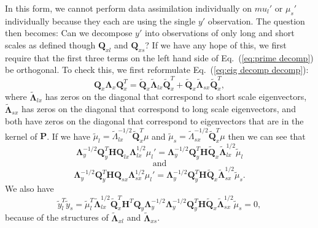 \documentclass[11pt]{article} %
\newcommand{\mat}{\mathbf}
\begin{document}
In this form, we cannot perform data assimilation individually on
$mu_l'$ or $\mu_s'$ individually because they each are using the
single $y'$ observation.
The question then becomes: Can we decompose $y'$ into observations of
only long and short scales as defined though $\mat{Q}_{xl}$ and
$\mat{Q}_{xs}$?
If we have any hope of this, we first require that the first three
terms on the left hand side of Eq.~(\ref{eq:prime decomp}) be
orthogonal.
To check this, we first reformulate Eq.~(\ref{eq:eig decomp decomp}):
\begin{equation}\label{eq:eig decomp decomp full}
  \mat{Q}_x \mat{\Lambda}_x \mat{Q}_x^T
  = \tilde{\mat{Q}}_{x} \tilde{\mat{\Lambda}}_{lx} \tilde{\mat{Q}}_{x}^T
  + \tilde{\mat{Q}}_{x} \tilde{\mat{\Lambda}}_{sx} \tilde{\mat{Q}}_{x}^T,
\end{equation}
where $\tilde{\mat{\Lambda}}_{lx}$ has zeros on the diagonal that
correspond to short scale eigenvectors,
$\tilde{\mat{\Lambda}}_{sx}$ has zeros on the diagonal that correspond
to long scale eigenvectors, and both have zeros on the diagonal that
correspond to eigenvectors that are in the kernel of $\mat{P}$.
If we have $\tilde{\mu}_l = \tilde{\Lambda}_{lx}^{-1/2}
\tilde{\mat{Q}}_x^T \mu$ and $\tilde{\mu}_s =
\tilde{\Lambda}_{sx}^{-1/2} \tilde{\mat{Q}}_x^T \mu$ then we can see
that
\[
  \mat{\Lambda}_y^{-1/2} \mat{Q}_y^T
  \mat{H} \mat{Q}_{lx} \mat{\Lambda}_{lx}^{1/2} \mu_l'
  =\mat{\Lambda}_y^{-1/2} \mat{Q}_y^T
  \mat{H} \tilde{\mat{Q}}_{x} \tilde{\mat{\Lambda}}_{lx}^{1/2}
  \tilde{\mu}_l
\]
\[\text{and}\]
\[
  \mat{\Lambda}_y^{-1/2} \mat{Q}_y^T
  \mat{H} \mat{Q}_{sx} \mat{\Lambda}_{sx}^{1/2} \mu_l'
  =\mat{\Lambda}_y^{-1/2} \mat{Q}_y^T
  \mat{H} \tilde{\mat{Q}}_{x} \tilde{\mat{\Lambda}}_{sx}^{1/2}
  \tilde{\mu}_s.
\]
We also have
\begin{equation}\label{eq:orth mus}
  \tilde{y}_l^T \tilde{y}_s
  = \tilde{\mu}_l^T \tilde{\mat{\Lambda}}_{lx}^{1/2}
  \tilde{\mat{Q}}_x^T
  \mat{H}^T \mat{Q}_y \mat{\Lambda}_y^{-1/2}
  \mat{\Lambda}_y^{-1/2} \mat{Q}_y^T
  \mat{H} \tilde{\mat{Q}}_{x} \tilde{\mat{\Lambda}}_{sx}^{1/2}
  \tilde{\mu}_s
  = 0,
\end{equation}
because of the structures of $\tilde{\mat{\Lambda}}_{xl}$ and
$\tilde{\mat{\Lambda}}_{xs}$.











\end{document}
